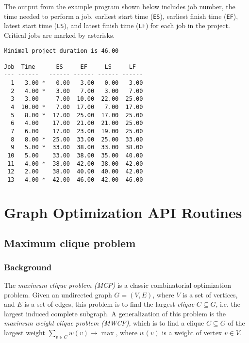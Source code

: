 \documentclass[dvipdfm,11pt]{report}
\begin{document}
The output from the example program shown below includes job number,
the time needed to perform a job, earliest start time (\verb|ES|),
earliest finish time (\verb|EF|), latest start time (\verb|LS|), and
latest finish time (\verb|LF|) for each job in the project. Critical
jobs are marked by asterisks.

\newpage

\begin{footnotesize}
\begin{verbatim}
Minimal project duration is 46.00

Job  Time      ES     EF     LS     LF
--- ------   ------ ------ ------ ------
  1   3.00 *   0.00   3.00   0.00   3.00
  2   4.00 *   3.00   7.00   3.00   7.00
  3   3.00     7.00  10.00  22.00  25.00
  4  10.00 *   7.00  17.00   7.00  17.00
  5   8.00 *  17.00  25.00  17.00  25.00
  6   4.00    17.00  21.00  21.00  25.00
  7   6.00    17.00  23.00  19.00  25.00
  8   8.00 *  25.00  33.00  25.00  33.00
  9   5.00 *  33.00  38.00  33.00  38.00
 10   5.00    33.00  38.00  35.00  40.00
 11   4.00 *  38.00  42.00  38.00  42.00
 12   2.00    38.00  40.00  40.00  42.00
 13   4.00 *  42.00  46.00  42.00  46.00
\end{verbatim}
\end{footnotesize}


\chapter{Graph Optimization API Routines}

\section{Maximum clique problem}

\subsection{Background}

The {\it maximum clique problem (MCP)} is a classic combinatorial
optimization problem. Given an undirected graph $G=(V,E)$, where $V$ is
a set of vertices, and $E$ is a set of edges, this problem is to find
the largest {\it clique} $C\subseteq G$, i.e. the largest induced
complete subgraph. A generalization of this problem is the {\it maximum
weight clique problem (MWCP)}, which is to find a clique $C\subseteq G$
of the largest weight $\displaystyle\sum_{v\in C}w(v)\rightarrow\max$,
where $w(v)$ is a weight of vertex $v\in V$.
\end{document}
